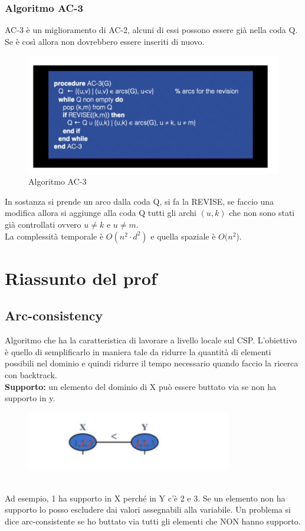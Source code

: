 \subsubsection{Algoritmo AC-3}
AC-3 è un miglioramento di AC-2, alcuni di essi possono essere già nella
coda Q. Se è così allora non dovrebbero essere inseriti di nuovo.
\begin{figure}[htp]
    \centering
    \includegraphics[width=13cm, keepaspectratio]{img/Cap3/ac-3.png}
    \caption{Algoritmo AC-3}
\end{figure}
In sostanza si prende un arco dalla coda Q, si fa la REVISE, se faccio una
modifica allora si aggiunge alla coda Q tutti gli archi $(u,k)$ che non sono stati
già controllati ovvero $u \neq k$ e $u \neq m$.\\
La complessità temporale è $O(n^2 \cdot d^2)$ e quella spaziale è $O(n^2$).

\section{Riassunto del prof}
\subsection{Arc-consistency}
Algoritmo che ha la caratteristica di lavorare a livello locale sul CSP.
L'obiettivo è quello di semplificarlo in maniera tale da ridurre la quantità di
elementi possibili nel dominio e quindi ridurre il tempo necessario quando
faccio la ricerca con backtrack. \\\textbf{Supporto: } un elemento del dominio
di X può essere buttato via se non ha supporto in y.
\begin{figure}[htp]
    \centering
    \includegraphics[width=9cm, keepaspectratio]{img/Cap3/riassunto1.png}
\end{figure}
\\Ad esempio, 1 ha supporto in X perché in Y c'è 2 e 3. Se un elemento non ha
supporto lo posso escludere dai valori assegnabili alla variabile. Un problema
si dice arc-consistente se ho buttato via tutti gli elementi che NON hanno
supporto.


